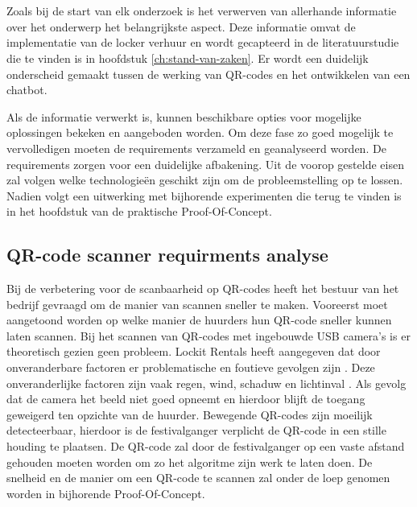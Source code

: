 
\chapter{}%
\label{ch:methodologie}


Zoals bij de start van elk onderzoek is het verwerven van allerhande informatie over het onderwerp het belangrijkste aspect. Deze informatie omvat de implementatie van de locker verhuur en wordt gecapteerd in de literatuurstudie die te vinden is in hoofdstuk \ref{ch:stand-van-zaken}. Er wordt een duidelijk onderscheid gemaakt tussen de werking van QR-codes en het ontwikkelen van een chatbot. 

Als de informatie verwerkt is, kunnen beschikbare opties voor mogelijke oplossingen bekeken en aangeboden worden. Om deze fase zo goed mogelijk te vervolledigen moeten de requirements verzameld en geanalyseerd worden. De requirements zorgen voor een duidelijke afbakening. Uit de voorop gestelde eisen zal volgen welke technologieën geschikt zijn om de probleemstelling op te lossen. Nadien volgt een uitwerking met bijhorende experimenten die terug te vinden is in het hoofdstuk van de praktische Proof-Of-Concept.


\section{QR-code scanner requirments analyse}%
\label{sec:scannerRequirment}

Bij de verbetering voor de scanbaarheid op QR-codes heeft het bestuur van het bedrijf gevraagd om de manier van scannen sneller te maken. Vooreerst moet aangetoond worden op welke manier de huurders hun QR-code sneller kunnen laten scannen. Bij het scannen van QR-codes met ingebouwde USB camera’s is er theoretisch gezien geen probleem. Lockit Rentals heeft aangegeven dat door onveranderbare factoren er problematische en foutieve gevolgen zijn \autocite{Girisha2022}. Deze onveranderlijke factoren zijn vaak regen, wind, schaduw en lichtinval \autocite{Ou2014}.  Als gevolg dat de camera het beeld niet goed opneemt en hierdoor blijft de toegang geweigerd ten opzichte van de huurder. 
Bewegende QR-codes zijn moeilijk detecteerbaar, hierdoor is de festivalganger verplicht de QR-code in een stille houding te plaatsen. De QR-code zal door de festivalganger op een vaste afstand gehouden moeten worden om zo het algoritme zijn werk te laten doen\autocite{Suriyon2021}. De snelheid en de manier om een QR-code te scannen zal onder de loep genomen worden in bijhorende Proof-Of-Concept.

